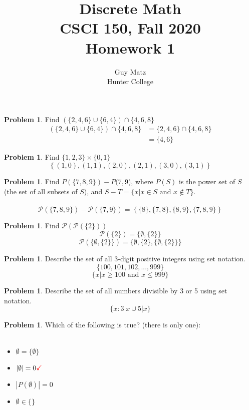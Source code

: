 \documentclass[10pt,leqno ]{article}
\title{Discrete Math\\
CSCI 150, Fall 2020\\
Homework 1}
\author{Guy Matz \\
Hunter College}
\theoremstyle{definition}
\newtheorem{problem}[theorem]{Problem}
\begin{document}
\begin{problem} Find $(\{2,4,6\} \cup  \{6,4\}) \cap \{4,6,8\}$
\\
\Large
\begin{align*}
(\{2,4,6\} \cup  \{6,4\}) \cap \{4,6,8\} &= \{2,4,6\} \cap \{4,6,8\}\\
        &=  \{4,6\}
\end{align*}
\end{problem}
\newpage

\begin{problem} Find $\{1,2,3\} \times \{0,1\}$
\\
$$\left\{ (1,0), (1,1), (2,0), (2,1), (3,0), (3,1) \right\}$$
\Large

\end{problem}
\newpage
\begin{problem} Find $P(\{7,8,9\})-P({7,9}$), where $P(S)$ is the power set of $S$ (the set of all subsets of $S$), and $S-T = \{x|x \in S \text{ and } x \notin T\}$.
\\\\
\Large
$$\mathcal{P}(\{7,8,9\}) - \mathcal{P}(\{7,9\}) = \left\{ \{8\}, \{7,8\}, \{8, 9\} , \{7,8,9\} \right\}$$
\end{problem}
\newpage
\begin{problem} Find $\mathcal{P}(\mathcal{P}(\{2\}))$
\\
\Large
$$\mathcal{P}(\{2\}) = \{\emptyset, \{2\}\}$$
$$\mathcal{P}(\{\emptyset, \{2\}\}) = \{\emptyset, \{2\}, \{\emptyset, \{2\}\}\}$$
\end{problem}
\newpage
\begin{problem} Describe the set of all 3-digit positive integers using set notation.
\\
\Large
$$\{100, 101, 102, ... , 999\}$$
$$ \{ x | x \geq 100 \text{ and } x \leq 999 \}$$
\end{problem}
\newpage
\begin{problem} Describe the set of all numbers divisible by 3 or 5 using set notation.
\\
\Large
$$\{x : 3 | x \cup 5|x \}$$
\end{problem}
\newpage

\begin{problem} Which  of  the  following  is  true?   (there  is  only  one):
\\\\
\begin{itemize}
\item $\emptyset=\{\emptyset\}$
\item $|\emptyset|=  0 \color{red}\checkmark$
\item $|P(\emptyset)|= 0$
\item $\emptyset \in \{ \}$
\end{itemize}
\Large

\end{problem}
\newpage
\end{document}
